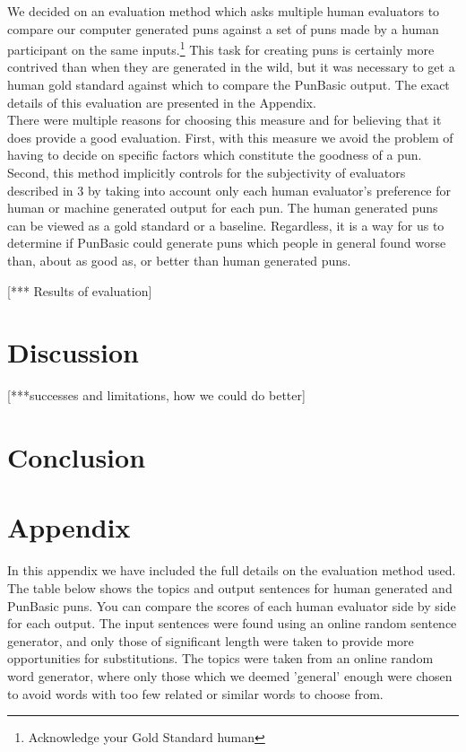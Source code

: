 \documentclass{article}
\begin{document}
We decided on an evaluation method which asks multiple human evaluators to compare our computer generated puns against a set of puns made by a human participant on the same inputs.\footnote{Acknowledge your Gold Standard human} This task for creating puns is certainly more contrived than when they are generated in the wild, but it was necessary to get a human gold standard against which to compare the PunBasic output. The exact details of this evaluation are presented in the Appendix.\\

There were multiple reasons for choosing this measure and for believing that it does provide a good evaluation. First, with this measure we avoid the problem of having to decide on specific factors which constitute the goodness of a pun. Second, this method implicitly controls for the subjectivity of evaluators described in 3 by taking into account only each human evaluator's preference for human or machine generated output for each pun. The human generated puns can be viewed as a gold standard or a baseline. Regardless, it is a way for us to determine if PunBasic could generate puns which people in general found worse than, about as good as, or better than human generated puns.

[*** Results of evaluation]

\section{Discussion}

[***successes and limitations, how we could do better]

\section{Conclusion}

\section{Appendix}

In this appendix we have included the full details on the evaluation method used.\\

The table below shows the topics and output sentences for human generated and PunBasic puns. You can compare the scores of each human evaluator side by side for each output. The input sentences were found using an online random sentence generator, and only those of significant length were taken to provide more opportunities for substitutions. The topics were taken from an online random word generator, where only those which we deemed 'general' enough were chosen to avoid words with too few related or similar words to choose from.\\
\end{document}
